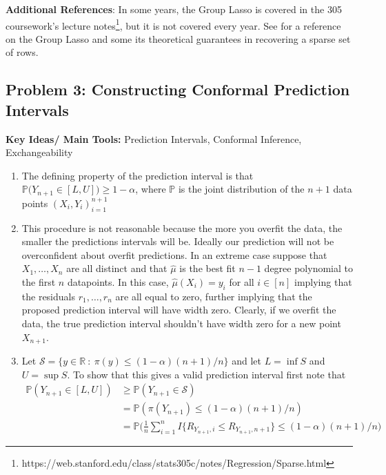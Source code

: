 \textbf{Additional References}: In some years, the Group Lasso is covered in the 305 coursework's lecture notes\footnote{https://web.stanford.edu/class/stats305c/notes/Regression/Sparse.html}, but it is not covered every year. See \cite{GroupLasso2013Obozinski} for a reference on the Group Lasso and some its theoretical guarantees in recovering a sparse set of rows.


\subsection*{Problem 3: Constructing Conformal Prediction Intervals}

\textbf{Key Ideas/ Main Tools:} Prediction Intervals, Conformal Inference, Exchangeability


\begin{enumerate}[label=(\alph*)]
\item The defining property of the prediction interval is that $\mathbb{P} \big(Y_{n+1} \in [L,U]  \big) \geq 1-\alpha$, where $\mathbb{P}$ is the joint distribution of the $n+1$ data points $(X_i,Y_i)_{i=1}^{n+1}$

\item This procedure is not reasonable because the more you overfit the data, the smaller the predictions intervals will be. Ideally our prediction will not be overconfident about overfit predictions. In an extreme case suppose that $X_1, \dots, X_n$ are all distinct and that $\hat{\mu}$ is the best fit $n-1$ degree polynomial to the first $n$ datapoints. In this case, $\hat{\mu}(X_i)=y_i$ for all $i \in [n]$ implying that the residuals $r_1,\dots,r_n$ are all equal to zero, further implying that the proposed prediction interval will have width zero. Clearly, if we overfit the data, the true prediction interval shouldn't have width zero for a new point $X_{n+1}$.

\item Let $\mathcal{S} = \{ y \in \mathbb{R} \ : \ \pi(y) \leq (1- \alpha)(n+1)/n \}$ and let $L = \inf S$ and $U = \sup S$. To show that this gives a valid prediction interval first note that
$$\begin{aligned}
\mathbb{P} (Y_{n+1} \in [L,U] ) & \geq \mathbb{P} (Y_{n+1} \in \mathcal{S} )
\\ & =  \mathbb{P} ( \pi(Y_{n+1}) \leq (1- \alpha)(n+1)/n )
\\ & = \mathbb{P} \Big( \frac{1}{n} \sum_{i=1}^n I \{ R_{Y_{n+1}, i} \leq R_{Y_{n+1}, n+1} \} \leq (1- \alpha)(n+1)/n   \Big)
\end{aligned}$$



\end{enumerate}
